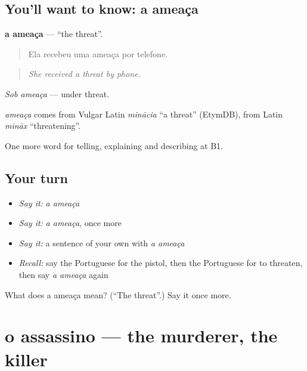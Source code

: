 \subsection*{You'll want to know: a ameaça}
\textbf{a ameaça} — \textquotedblleft{}the threat\textquotedblright{}.

\begin{quote}
Ela recebeu uma ameaça por telefone.
\end{quote}

\begin{quote}
\emph{She received a threat by phone.}
\end{quote}

\emph{Sob ameaça} — under threat.

\begin{cousinweb}
\emph{ameaça} comes from Vulgar Latin \emph{minācia} \textquotedblleft{}a threat\textquotedblright{} (EtymDB), from Latin \emph{mināx} \textquotedblleft{}threatening\textquotedblright{}.
\end{cousinweb}

\begin{grammarlens}[title={What you've built}]
One more word for telling, explaining and describing at B1.
\end{grammarlens}

\subsection*{Your turn}
\begin{itemize}
\raggedright
  \item \emph{Say it:} \emph{a ameaça}
  \item \emph{Say it:} \emph{a ameaça}, once more
  \item \emph{Say it:} a sentence of your own with \emph{a ameaça}
  \item \emph{Recall:} say the Portuguese for the pistol, then the Portuguese for to threaten, then say \emph{a ameaça} again
\end{itemize}

\begin{tcolorbox}[breakable,colback=teal!4,colframe=teal!35!black,title={Before you move on}]
What does a ameaça mean? (\textquotedblleft{}The threat\textquotedblright{}.) Say it once more.
\end{tcolorbox}
\section[o assassino]{o assassino — the murderer, the killer}

